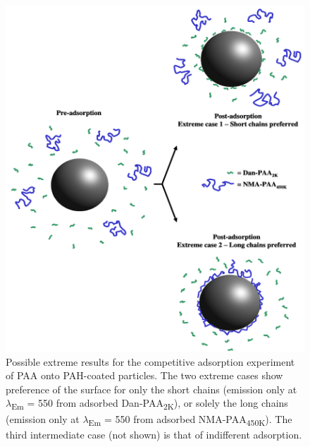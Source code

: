 \documentclass[journal=mamobx,manuscript=article]{achemso}
\begin{document}
\begin{figure}[H]
\includegraphics[scale=0.75]{Presentation1.pdf}
\caption{Possible extreme results for the competitive adsorption experiment of PAA onto PAH-coated particles.  The two extreme cases show preference of the surface for only the short chains (emission only at $\lambda$\textsubscript{Em} = 550 from adsorbed Dan-PAA\textsubscript{2K}), or solely the long chains (emission only at $\lambda$\textsubscript{Em} = 550 from adsorbed NMA-PAA\textsubscript{450K}).  The third intermediate case (not shown) is that of indifferent adsorption.}
\label{figure 4}
\end{figure}
\end{document}

